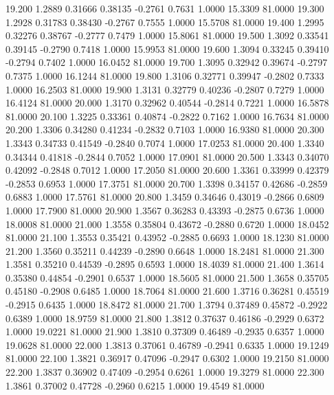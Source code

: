   19.200   1.2889   0.31666   0.38135  -0.2761   0.7631   1.0000  15.3309  81.0000
  19.300   1.2928   0.31783   0.38430  -0.2767   0.7555   1.0000  15.5708  81.0000
  19.400   1.2995   0.32276   0.38767  -0.2777   0.7479   1.0000  15.8061  81.0000
  19.500   1.3092   0.33541   0.39145  -0.2790   0.7418   1.0000  15.9953  81.0000
  19.600   1.3094   0.33245   0.39410  -0.2794   0.7402   1.0000  16.0452  81.0000
  19.700   1.3095   0.32942   0.39674  -0.2797   0.7375   1.0000  16.1244  81.0000
  19.800   1.3106   0.32771   0.39947  -0.2802   0.7333   1.0000  16.2503  81.0000
  19.900   1.3131   0.32779   0.40236  -0.2807   0.7279   1.0000  16.4124  81.0000
  20.000   1.3170   0.32962   0.40544  -0.2814   0.7221   1.0000  16.5878  81.0000
  20.100   1.3225   0.33361   0.40874  -0.2822   0.7162   1.0000  16.7634  81.0000
  20.200   1.3306   0.34280   0.41234  -0.2832   0.7103   1.0000  16.9380  81.0000
  20.300   1.3343   0.34733   0.41549  -0.2840   0.7074   1.0000  17.0253  81.0000
  20.400   1.3340   0.34344   0.41818  -0.2844   0.7052   1.0000  17.0901  81.0000
  20.500   1.3343   0.34070   0.42092  -0.2848   0.7012   1.0000  17.2050  81.0000
  20.600   1.3361   0.33999   0.42379  -0.2853   0.6953   1.0000  17.3751  81.0000
  20.700   1.3398   0.34157   0.42686  -0.2859   0.6883   1.0000  17.5761  81.0000
  20.800   1.3459   0.34646   0.43019  -0.2866   0.6809   1.0000  17.7900  81.0000
  20.900   1.3567   0.36283   0.43393  -0.2875   0.6736   1.0000  18.0008  81.0000
  21.000   1.3558   0.35804   0.43672  -0.2880   0.6720   1.0000  18.0452  81.0000
  21.100   1.3553   0.35421   0.43952  -0.2885   0.6693   1.0000  18.1230  81.0000
  21.200   1.3560   0.35211   0.44239  -0.2890   0.6648   1.0000  18.2481  81.0000
  21.300   1.3581   0.35210   0.44539  -0.2895   0.6593   1.0000  18.4039  81.0000
  21.400   1.3614   0.35380   0.44854  -0.2901   0.6537   1.0000  18.5605  81.0000
  21.500   1.3658   0.35705   0.45180  -0.2908   0.6485   1.0000  18.7064  81.0000
  21.600   1.3716   0.36281   0.45519  -0.2915   0.6435   1.0000  18.8472  81.0000
  21.700   1.3794   0.37489   0.45872  -0.2922   0.6389   1.0000  18.9759  81.0000
  21.800   1.3812   0.37637   0.46186  -0.2929   0.6372   1.0000  19.0221  81.0000
  21.900   1.3810   0.37309   0.46489  -0.2935   0.6357   1.0000  19.0628  81.0000
  22.000   1.3813   0.37061   0.46789  -0.2941   0.6335   1.0000  19.1249  81.0000
  22.100   1.3821   0.36917   0.47096  -0.2947   0.6302   1.0000  19.2150  81.0000
  22.200   1.3837   0.36902   0.47409  -0.2954   0.6261   1.0000  19.3279  81.0000
  22.300   1.3861   0.37002   0.47728  -0.2960   0.6215   1.0000  19.4549  81.0000
